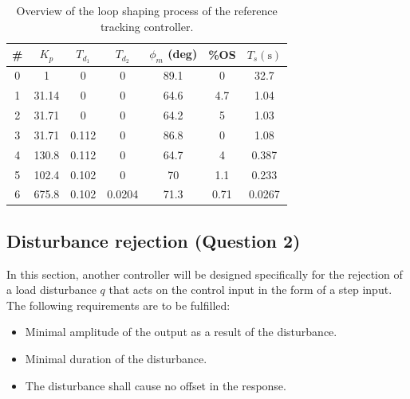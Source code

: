 \begin{table}[ht]
    \centering
    \caption{Overview of the loop shaping process of the reference tracking controller.}
    \label{tab:loopshaping1}
    \begin{tabular}{ccccccc}
        \toprule
            \# & $K_p$ & $T_{d_1}$ & $T_{d_2}$ & $\phi_m$ (deg) & \%OS & $T_s (\si{\second})$ \\
        \midrule
            0 & 1 & 0 & 0 & 89.1 &  0 & 32.7\\ 
            1 & 31.14 &        0 &        0 &  64.6 &   4.7 &  1.04\\ 
            2 & 31.71 &        0 &        0 &  64.2 &     5 &  1.03\\ 
            3 & 31.71 &    0.112 &        0 &  86.8 &     0 &  1.08\\ 
            4 & 130.8 &    0.112 &        0 &  64.7 &     4 & 0.387\\ 
            5 & 102.4 &    0.102 &        0 &    70 &   1.1 & 0.233\\ 
            6 & 675.8 &    0.102 &   0.0204 &  71.3 &  0.71 & 0.0267\\ 
        \bottomrule
    \end{tabular}
\end{table}

\subsection{Disturbance rejection \textnormal{\phantom{xxx}(Question 2)}}
\label{sec:continuousdisturbance}
In this section, another controller will be designed specifically for the rejection of a load disturbance $q$ that acts on the control input in the form of a step input. The following requirements are to be fulfilled:
\begin{itemize}
    \item Minimal amplitude of the output as a result of the disturbance.
    \item Minimal duration of the disturbance.
    \item The disturbance shall cause no offset in the response.
\end{itemize}
